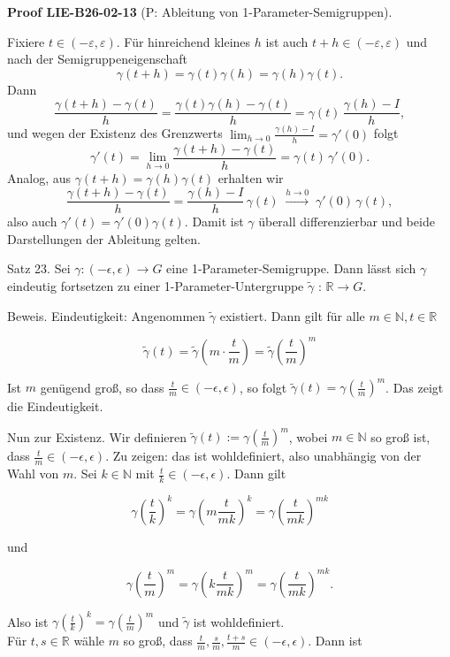 \documentclass[10pt, letterpaper]{article}
\newcommand{\CustomHeading}[3]{%
  \par\medskip\noindent%
  \textbf{#1 #2} \textnormal{(#3)}.\enskip%
}
\newenvironment{PROOF}[2]{\begin{unitbox}\CustomHeading{Proof}{#1}{#2}}{\end{unitbox}}
\begin{document}
\begin{PROOF}{LIE-B26-02-13}{P: Ableitung von 1-Parameter-Semigruppen}
Fixiere $t\in(-\varepsilon,\varepsilon)$. Für hinreichend kleines $h$ ist auch $t+h\in(-\varepsilon,\varepsilon)$ und nach der Semigruppeneigenschaft
\[
\gamma(t+h)=\gamma(t)\gamma(h)=\gamma(h)\gamma(t).
\]
Dann
\[
\frac{\gamma(t+h)-\gamma(t)}{h}
=\frac{\gamma(t)\gamma(h)-\gamma(t)}{h}
=\gamma(t)\,\frac{\gamma(h)-I}{h},
\]
und wegen der Existenz des Grenzwerts $\lim_{h\to 0}\frac{\gamma(h)-I}{h}=\gamma'(0)$ folgt
\[
\gamma'(t)=\lim_{h\to 0}\frac{\gamma(t+h)-\gamma(t)}{h}
=\gamma(t)\,\gamma'(0).
\]
Analog, aus $\gamma(t+h)=\gamma(h)\gamma(t)$ erhalten wir
\[
\frac{\gamma(t+h)-\gamma(t)}{h}
=\frac{\gamma(h)-I}{h}\,\gamma(t)\;\xrightarrow{h\to 0}\;\gamma'(0)\,\gamma(t),
\]
also auch $\gamma'(t)=\gamma'(0)\gamma(t)$. Damit ist $\gamma$ überall differenzierbar und beide Darstellungen der Ableitung gelten.
\end{PROOF}




Satz 23. Sei $\gamma:(-\epsilon, \epsilon) \rightarrow G$ eine 1-Parameter-Semigruppe. Dann lässt sich $\gamma$ eindeutig fortsetzen zu einer 1-Parameter-Untergruppe $\tilde{\gamma}$ : $\mathbb{R} \rightarrow G$.

Beweis. Eindeutigkeit: Angenommen $\tilde{\gamma}$ existiert. Dann gilt für alle $m \in \mathbb{N}, t \in \mathbb{R}$

$$
\tilde{\gamma}(t)=\tilde{\gamma}\left(m \cdot \frac{t}{m}\right)=\tilde{\gamma}\left(\frac{t}{m}\right)^{m}
$$

Ist $m$ genügend groß, so dass $\frac{t}{m} \in(-\epsilon, \epsilon)$, so folgt $\tilde{\gamma}(t)=\gamma\left(\frac{t}{m}\right)^{m}$. Das zeigt die Eindeutigkeit.

Nun zur Existenz. Wir definieren $\tilde{\gamma}(t):=\gamma\left(\frac{t}{m}\right)^{m}$, wobei $m \in \mathbb{N}$ so groß ist, dass $\frac{t}{m} \in(-\epsilon, \epsilon)$. Zu zeigen: das ist wohldefiniert, also unabhängig von der Wahl von $m$. Sei $k \in \mathbb{N}$ mit $\frac{t}{k} \in(-\epsilon, \epsilon)$. Dann gilt

$$
\gamma\left(\frac{t}{k}\right)^{k}=\gamma\left(m \frac{t}{m k}\right)^{k}=\gamma\left(\frac{t}{m k}\right)^{m k}
$$

und

$$
\gamma\left(\frac{t}{m}\right)^{m}=\gamma\left(k \frac{t}{m k}\right)^{m}=\gamma\left(\frac{t}{m k}\right)^{m k} .
$$

Also ist $\gamma\left(\frac{t}{k}\right)^{k}=\gamma\left(\frac{t}{m}\right)^{m}$ und $\tilde{\gamma}$ ist wohldefiniert.\\
Für $t, s \in \mathbb{R}$ wähle $m$ so groß, dass $\frac{t}{m}, \frac{s}{m}, \frac{t+s}{m} \in(-\epsilon, \epsilon)$. Dann ist
\end{document}
